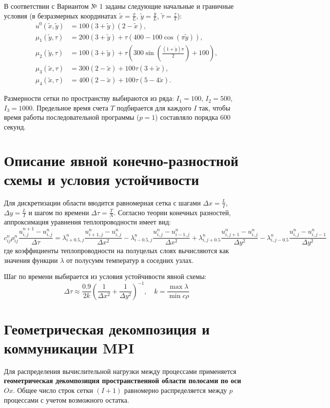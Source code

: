 	В соответствии с Вариантом № 1 заданы следующие начальные и граничные условия (в безразмерных координатах $\tilde{x} = \frac{x}{L}$, $\tilde{y} = \frac{y}{L}$, $\tilde{\tau} = \frac{\tau}{T}$):
	\begin{align*}
		u^0(\tilde{x}, \tilde{y}) &= 100(3 + \tilde{y})(2 - \tilde{x}), \\
		\mu_1(\tilde{y}, \tau) &= 200(3 + \tilde{y}) + \tau(400 - 100\cos(\pi\tilde{y})), \\
		\mu_2(\tilde{y}, \tau) &= 100(3 + \tilde{y}) + \tau\left(300\sin\left(\frac{(1 + \tilde{y})\pi}{2}\right) + 100\right), \\
		\mu_3(\tilde{x}, \tau) &= 300(2 - \tilde{x}) + 100\tau(3 + \tilde{x}), \\
		\mu_4(\tilde{x}, \tau) &= 400(2 - \tilde{x}) + 100\tau(5 - 4\tilde{x}).
	\end{align*}
	
	Размерности сетки по пространству выбираются из ряда: $I_1 = 100$, $I_2 = 500$, $I_3 = 1000$. Предельное время счета $T$ подбирается для каждого $I$ так, чтобы время работы последовательной программы ($p = 1$) составляло порядка 600 секунд.
	
	\section{Описание явной конечно-разностной схемы и условия устойчивости}
	Для дискретизации области вводится равномерная сетка с шагами $\Delta x = \frac{L}{I}$, $\Delta y = \frac{L}{I}$ и шагом по времени $\Delta \tau = \frac{T}{N}$. Согласно теории конечных разностей, аппроксимация уравнения теплопроводности имеет вид:
	\[ c_{ij}^n \rho_{ij}^n \frac{u_{i,j}^{n+1} - u_{i,j}^n}{\Delta \tau} = \lambda_{i+0.5,j}^n \frac{u_{i+1,j}^n - u_{i,j}^n}{\Delta x^2} - \lambda_{i-0.5,j}^n \frac{u_{i,j}^n - u_{i-1,j}^n}{\Delta x^2} + \lambda_{i,j+0.5}^n \frac{u_{i,j+1}^n - u_{i,j}^n}{\Delta y^2} - \lambda_{i,j-0.5}^n \frac{u_{i,j}^n - u_{i,j-1}^n}{\Delta y^2} \]
	где коэффициенты теплопроводности на полуцелых слоях вычисляются как значения функции $\lambda$ от полусумм температур в соседних узлах.
	
	Шаг по времени выбирается из условия устойчивости явной схемы:
	\[ \Delta \tau \approx \frac{0.9}{2k} \left(\frac{1}{\Delta x^2} + \frac{1}{\Delta y^2}\right)^{-1}, \quad k = \frac{\max \lambda}{\min c\rho} \]
	
	\section{Геометрическая декомпозиция и коммуникации MPI}
	Для распределения вычислительной нагрузки между процессами применяется \textbf{геометрическая декомпозиция пространственной области полосами по оси $Ox$}. Общее число строк сетки $(I+1)$ равномерно распределяется между $p$ процессами с учетом возможного остатка.
	
